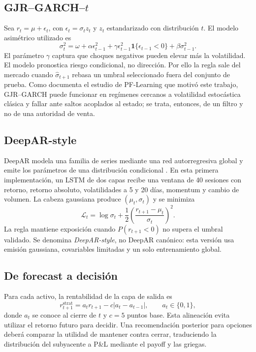 \documentclass[11pt]{article}
\begin{document}
\subsection{GJR--GARCH--$t$}
Sea $r_t=\mu+\epsilon_t$, con $\epsilon_t=\sigma_t z_t$ y $z_t$ estandarizado con distribución $t$.
El modelo asimétrico utilizado es
\begin{equation}
 \sigma_t^2=\omega+\alpha\epsilon_{t-1}^2+
 \gamma\epsilon_{t-1}^2\mathbf{1}\{\epsilon_{t-1}<0\}+\beta\sigma_{t-1}^2.
\end{equation}
El parámetro $\gamma$ captura que choques negativos pueden elevar más la volatilidad. El modelo pronostica
riesgo condicional, no dirección. Por ello la regla sale del mercado cuando $\hat\sigma_{t+1}$ rebasa un umbral
seleccionado fuera del conjunto de prueba. Como documenta el estudio de PF-Learning que motivó este trabajo,
GJR--GARCH puede funcionar en regímenes cercanos a volatilidad estocástica clásica y fallar ante saltos
acoplados al estado; se trata, entonces, de un filtro y no de una autoridad de venta.

\subsection{DeepAR-style}
DeepAR modela una familia de series mediante una red autorregresiva global y emite los parámetros de una
distribución condicional \cite{deepar}. En esta primera implementación, un LSTM de dos capas recibe una ventana
de 40 sesiones con retorno, retorno absoluto, volatilidades a 5 y 20 días, momentum y cambio de volumen. La
cabeza gaussiana produce $(\mu_t,\sigma_t)$ y se minimiza
\begin{equation}
 \mathcal L_t=\log\sigma_t+\frac{1}{2}\left(\frac{r_{t+1}-\mu_t}{\sigma_t}\right)^2.
\end{equation}
La regla mantiene exposición cuando $P(r_{t+1}<0)$ no supera el umbral validado. Se denomina
\emph{DeepAR-style}, no DeepAR canónico: esta versión usa emisión gaussiana, covariables limitadas y un solo
entrenamiento global.

\subsection{De forecast a decisión}
Para cada activo, la rentabilidad de la capa de salida es
\begin{equation}
 r^{\mathrm{strat}}_{t+1}=a_t r_{t+1}-c|a_t-a_{t-1}|,\qquad a_t\in\{0,1\},
\end{equation}
donde $a_t$ se conoce al cierre de $t$ y $c=5$ puntos base. Esta alineación evita utilizar el retorno futuro para
decidir. Una recomendación posterior para opciones deberá comparar la utilidad de mantener contra cerrar,
traduciendo la distribución del subyacente a P\&L mediante el payoff y las griegas.
\end{document}
